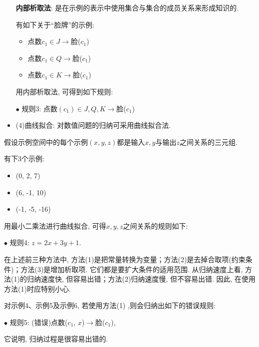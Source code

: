 \begin{itemize}
\textbf{内部析取法}: 是在示例的表示中使用集合与集合的成员关系来形成知识的.

\begin{example}
有如下关于“脸牌”的示例:
\begin{itemize}
\item 点数$c_1\in {J}\rightarrow$脸($c_1$)
\item 点数$c_1\in {Q}\rightarrow$脸($c_1$)
\item 点数$c_1\in {K}\rightarrow$脸($c_1$)
\end{itemize}

用内部析取法, 可得到如下规则:

$\bullet$ 规则3: 点数$(c_1)\in {J, Q, K}\rightarrow$脸($c_1$)
\end{example}
\item (4)曲线拟合: 对数值问题的归纳可采用曲线拟合法.
\end{itemize}
假设示例空间中的每个示例$(x, y, z)$都是输入$x, y$与输出$z$之间关系的三元组.
\begin{example}
有下3个示例:
\begin{itemize}
\item (0, 2, 7)
\item (6, -1, 10)
\item (-1, -5, -16)
\end{itemize}

用最小二乘法进行曲线拟合, 可得$x, y, z$之间关系的规则如下:

$\bullet$ 规则4: $z=2x+3y+1$.
\end{example}
\begin{remark}
在上述前三种方法中, 方法(1)是把常量转换为变量；方法(2)是去掉合取项(约束条件)；方法(3)是增加析取项. 它们都是要扩大条件的适用范围. 从归纳速度上看, 方法(1)的归纳速度快, 但容易出错；方法(2)归纳速度慢, 但不容易出错. 因此, 在使用方法(1)时应特别小心.

\begin{example}
对示例4、示例5及示例6, 若使用方法(1) ,则会归纳出如下的错误规则:
\begin{center}
  $\bullet$ 规则5: (错误)点数($c_1$, $x$)$\rightarrow$脸($c_1$),
\end{center}
它说明, 归纳过程是很容易出错的.
\end{example}
\end{remark}


